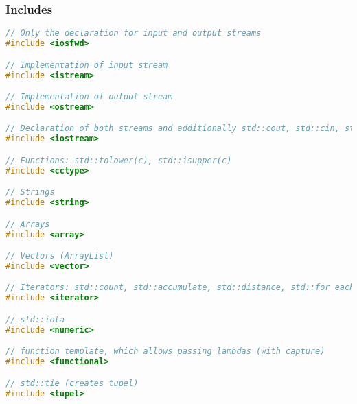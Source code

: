 
\subsubsection{Includes}
\begin{lstlisting}[style=frame, style= linenumbers, language=C]
// Only the declaration for input and output streams
#include <iosfwd>

// Implementation of input stream
#include <istream>

// Implementation of output stream
#include <ostream>

// Declaration of both streams and additionally std::cout, std::cin, std::cerr
#include <iostream>

// Functions: std::tolower(c), std::isupper(c)
#include <cctype>

// Strings
#include <string>

// Arrays
#include <array>

// Vectors (ArrayList)
#include <vector>

// Iterators: std::count, std::accumulate, std::distance, std::for_each
#include <iterator>

// std::iota
#include <numeric>

// function template, which allows passing lambdas (with capture)
#include <functional>

// std::tie (creates tupel)
#include <tupel>
\end{lstlisting}